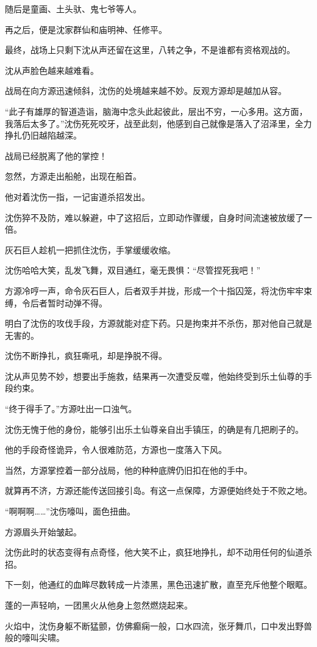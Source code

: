 \begin{this_body}
随后是童画、土头驮、鬼七爷等人。

再之后，便是沈家群仙和庙明神、任修平。

最终，战场上只剩下沈从声还留在这里，八转之争，不是谁都有资格观战的。

沈从声脸色越来越难看。

战局在向方源迅速倾斜，沈伤的处境越来越不妙。反观方源却是越加从容。

“此子有雄厚的智道造诣，脑海中念头此起彼此，层出不穷，一心多用。这方面，我落后太多了。”沈伤死死咬牙，战至此刻，他感到自己就像是落入了沼泽里，全力挣扎仍旧越陷越深。

战局已经脱离了他的掌控！

忽然，方源走出船舱，出现在船首。

他对着沈伤一指，一记宙道杀招发出。

沈伤猝不及防，难以躲避，中了这招后，立即动作骤缓，自身时间流速被放缓了一倍。

灰石巨人趁机一把抓住沈伤，手掌缓缓收缩。

沈伤哈哈大笑，乱发飞舞，双目通红，毫无畏惧：“尽管捏死我吧！”

方源冷哼一声，命令灰石巨人，后者双手并拢，形成一个十指囚笼，将沈伤牢牢束缚，令后者暂时动弹不得。

明白了沈伤的攻伐手段，方源就能对症下药。只是拘束并不杀伤，那对他自己就是无害的。

沈伤不断挣扎，疯狂嘶吼，却是挣脱不得。

沈从声见势不妙，想要出手施救，结果再一次遭受反噬，他始终受到乐土仙尊的手段约束。

“终于得手了。”方源吐出一口浊气。

沈伤无愧于他的身份，能够引出乐土仙尊亲自出手镇压，的确是有几把刷子的。

他的手段奇怪诡异，令人很难防范，方源也一度落入下风。

当然，方源掌控着一部分战局，他的种种底牌仍旧扣在他的手中。

就算再不济，方源还能传送回接引岛。有这一点保障，方源便始终处于不败之地。

“啊啊啊……”沈伤嚎叫，面色扭曲。

方源眉头开始皱起。

沈伤此时的状态变得有点奇怪，他大笑不止，疯狂地挣扎，却不动用任何的仙道杀招。

下一刻，他通红的血眸尽数转成一片漆黑，黑色迅速扩散，直至充斥他整个眼眶。

蓬的一声轻响，一团黑火从他身上忽然燃烧起来。

火焰中，沈伤身躯不断猛颤，仿佛癫痫一般，口水四流，张牙舞爪，口中发出野兽般的嚎叫尖啸。


\end{this_body}
